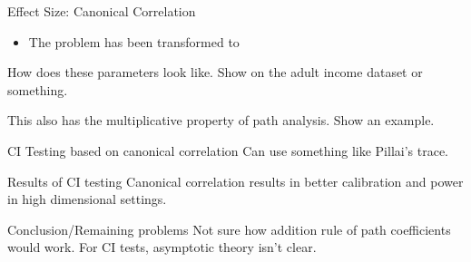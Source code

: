 \documentclass{beamer}
\begin{document}
\begin{frame}{Effect Size: Canonical Correlation}
	\begin{itemize}
		\item The problem has been transformed to 
	\end{itemize}
\end{frame}

\begin{frame}
	How does these parameters look like. Show on the adult income dataset
	or something.

	This also has the multiplicative property of path analysis. Show an
	example.
\end{frame}

\begin{frame}{CI Testing based on canonical correlation}
	Can use something like Pillai's trace.
\end{frame}

\begin{frame}{Results of CI testing}
	Canonical correlation results in better calibration and power in high
	dimensional settings.
\end{frame}

\begin{frame}{Conclusion/Remaining problems}
	Not sure how addition rule of path coefficients would work.
	For CI tests, asymptotic theory isn't clear.
\end{frame}
\end{document}
